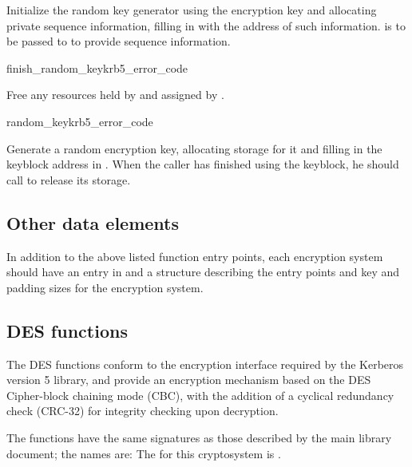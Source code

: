 Initialize the random key generator using the encryption key
 and allocating private sequence information, filling
in  with the address of such information.
 is to be passed to  to provide
sequence information.

\begin{funcdecl}{finish_random_key}{krb5_error_code}{\funcvoid}
\end{funcdecl}

Free any resources held by  and assigned by
. 

\begin{funcdecl}{random_key}{krb5_error_code}{\funcvoid}
\end{funcdecl}

Generate a random encryption key, allocating storage for it and
filling in the keyblock address in .
When the caller has finished using the keyblock, he should call
 to release its storage.


\subsection{Other data elements}
In addition to the above listed function entry points, each encryption
system should have an entry in  and a
 structure describing the entry points
and key and padding sizes for the encryption system.

\subsection{DES functions}
The DES functions conform to the encryption interface required by the
Kerberos version 5 library, and provide an encryption mechanism based on
the DES Cipher-block chaining mode (CBC), with the addition of a
cyclical redundancy check (CRC-32) for integrity checking upon
decryption.

The functions have the same signatures as those described by the main
library document; the names are:
{\obeylines
{}
}
The  for this cryptosystem is
.
